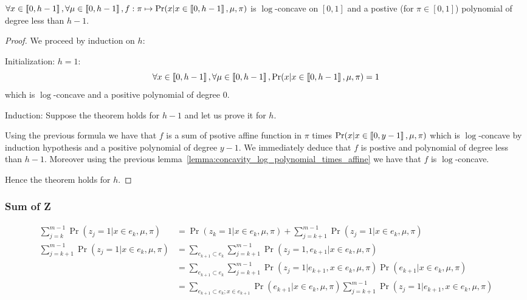 \begin{thm}
    $\forall x \in \left\llbracket0, h - 1\right\rrbracket, \forall \mu \in \left\llbracket0, h - 1\right\rrbracket, f: \pi \mapsto \Pr(x | x \in \left\llbracket0, h - 1\right\rrbracket, \mu, \pi)$ is $\log$-concave on $[0, 1]$ and a postive (for $\pi \in [0, 1]$) polynomial of degree less than $h - 1$.
\end{thm}
\begin{proof}
    We proceed by induction on $h$:

    Initialization: $h = 1$: 
    \[ \forall x \in \left\llbracket0, h - 1\right\rrbracket, \forall \mu \in \left\llbracket0, h - 1\right\rrbracket, \Pr(x | x \in \left\llbracket0, h - 1\right\rrbracket, \mu, \pi) = 1\] which is $\log$-concave and a positive polynomial of degree $0$.

    Induction: Suppose the theorem holds for $h - 1$ and let us prove it for $h$.

    Using the previous formula we have that $f$ is a sum of psotive affine function in $\pi$ times $\Pr(x | x \in \left\llbracket0, y - 1\right\rrbracket, \mu, \pi)$ which is $\log$-concave by induction hypothesis and a positive polynomial of degree $y - 1$. We immediately deduce that $f$ is postive and polynomial of degree less than $h - 1$. Moreover using the previous lemma~\ref{lemma:concavity_log_polynomial_times_affine} we have that $f$ is $\log$-concave.

    Hence the theorem holds for $h$.
\end{proof}



\subsubsection{Sum of Z}

\begin{align}
    \sum_{j=k}^{m - 1} \Pr(z_j = 1 | x \in e_k, \mu, \pi) 
    &= \Pr(z_k = 1 | x \in e_k, \mu, \pi) + \sum_{j=k+1}^{m - 1} \Pr(z_j = 1 | x \in e_k, \mu, \pi) \\
    \sum_{j=k+1}^{m - 1} \Pr(z_j = 1 | x \in e_k, \mu, \pi) 
    &= \sum_{e_{k+1} \subset e_k} \sum_{j=k+1}^{m - 1} \Pr(z_j = 1, e_{k+1} | x \in e_k, \mu, \pi)  \\
    &= \sum_{e_{k+1} \subset e_k} \sum_{j=k+1}^{m - 1} \Pr(z_j = 1 | e_{k+1}, x \in e_k, \mu, \pi) \Pr(e_{k+1} | x \in e_k, \mu, \pi) \\
    &= \sum_{e_{k+1} \subset e_k ; x\in e_{k+1}} \Pr(e_{k+1} | x \in e_k, \mu, \pi) \sum_{j=k+1}^{m - 1} \Pr(z_j = 1 | e_{k+1}, x \in e_k, \mu, \pi) 
\end{align}


